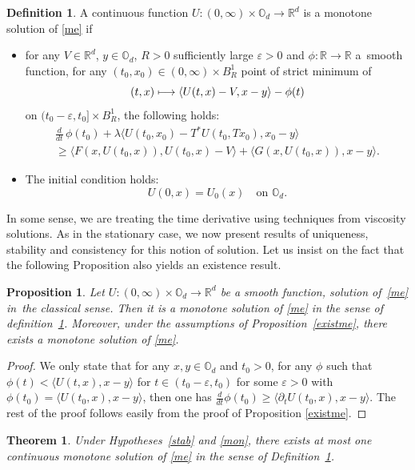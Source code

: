 \documentclass[JEP,XML,SOM,Unicode,NoEqCountersInSection,published]{cedram}
\newcommand\mto{\mathchoice{\longmapsto}{\mapsto}{\mapsto}{\mapsto}}
\let\epsilon\varepsilon
\newtheorem{Theorem}{Theorem}[section]
\newtheorem{Prop}{Proposition}[section]
\theoremstyle{definition}
\newtheorem{Def}{Definition}[section]
\begin{document}
\begin{Def}\label{defms}
A continuous function $U:(0,\infty)\!\times\!\mathbb{O}_d\!\to\! \mathbb{R}^d$ is a monotone solution of \eqref{me} if
\begin{itemize}
\item for any $V \in \mathbb{R}^d$, $y\!\in\!\mathbb{O}_d$, $R\!>\! 0$ sufficiently large $\epsilon\!>\!0$ and $\phi: \mathbb{R}\!\to\!\mathbb{R}$ a~smooth function, for any $(t_0,x_0)\in (0,\infty) \times B^1_R$ point of strict minimum of
\[
(t,x) \mto \langle U(t,x)-V, x-y\rangle-\phi(t)
\]
on $(t_0-\epsilon, t_0] \times B^1_R$, the following holds:
\begin{multline}\label{testt}
\frac{d}{dt}\, \phi(t_0) + \lambda \langle U(t_0,x_0)-T^*U(t_0,Tx_0),x_0-y \rangle \\
\geq
\langle F(x,U(t_0,x)), U(t_0,x)-V\rangle+\langle G(x,U(t_0,x)), x-y \rangle.
\end{multline}
\item The initial condition holds:
\begin{equation*}
U(0,x) = U_0(x) \quad\text{on } \mathbb{O}_d.
\end{equation*}
\end{itemize}
\end{Def}
In some sense, we are treating the time derivative using techniques from viscosity solutions. As in the stationary case, we now present results of uniqueness, stability and consistency for this notion of solution. Let us insist on the fact that the following Proposition also yields an existence result.
\begin{Prop}
Let $U: (0,\infty)\!\times\!\mathbb{O}_d\!\to\!\mathbb{R}^d$ be a smooth function, solution of~\eqref{me} in~the classical sense. Then it is a monotone solution of \eqref{me} in the sense of definition~\ref{defms}. Moreover, under the assumptions of Proposition~\ref{existme}, there exists a monotone solution of \eqref{me}.
\end{Prop}
\begin{proof}
We only state that for any $x,y \in \mathbb{O}_d$ and $t_0 > 0$, for any $\phi$ such that $\phi(t) < \langle U(t,x), x-y \rangle$ for $t \in (t_0-\epsilon, t_0)$ for some $\epsilon > 0$ with $\phi(t_0) = \langle U(t_0,x), x-y \rangle$, then one has $\frac{d}{dt}\phi(t_0) \geq \langle \partial_t U(t_0,x),x-y\rangle$. The rest of the proof follows easily from the proof of Proposition \ref{existme}.
\end{proof}
\begin{Theorem}\label{uniqt}
Under Hypotheses~\ref{stab} and \ref{mon}, there exists at most one continuous monotone solution of \eqref{me} in the sense of Definition~\ref{defms}.
\end{Theorem}
\end{document}
